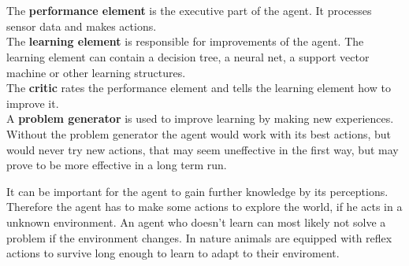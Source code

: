 \documentclass[10pt,a4paper,DIV=11]{scrreprt}
\begin{document}
   \\
\\



The \textbf{performance element} is the executive part of the agent. It processes sensor data and makes actions. \\

The \textbf{learning element} is responsible for improvements of the agent. The learning element can contain a decision tree, a neural net, a support vector machine or other learning structures. \\

The \textbf{critic} rates the performance element and tells the learning element how to improve it. \\

A \textbf{problem generator} is used to improve learning by making new experiences. Without the problem generator the agent would work with its best actions, but would never try new actions, that may seem uneffective in the first way, but may prove to be more effective in a long term run. 

It can be important for the agent to gain further knowledge by its perceptions. Therefore the agent has to make some actions to explore the world, if he acts in a unknown environment.
An agent who doesn't learn can most likely not solve a problem if the environment changes.
In nature animals are equipped with reflex actions to survive long enough to learn to adapt to their enviroment. \\
\end{document}
